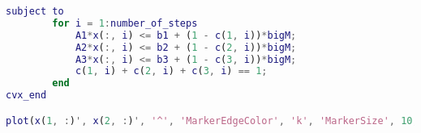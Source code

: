 \begin{lstlisting}[language=Matlab]
    subject to
        for i = 1:number_of_steps
            A1*x(:, i) <= b1 + (1 - c(1, i))*bigM;
            A2*x(:, i) <= b2 + (1 - c(2, i))*bigM;
            A3*x(:, i) <= b3 + (1 - c(3, i))*bigM;
            c(1, i) + c(2, i) + c(3, i) == 1;
        end
cvx_end

plot(x(1, :)', x(2, :)', '^', 'MarkerEdgeColor', 'k', 'MarkerSize', 10, 'LineWidth', 2); hold on;
\end{lstlisting}